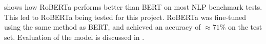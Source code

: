  shows how RoBERTa performs better than BERT on most NLP benchmark tests. This led to RoBERTa being tested for
this project. RoBERTa was fine-tuned using the same method as BERT, and achieved an accuracy of $\approx 71\%$ on the test set.
Evaluation of the model is discussed in .